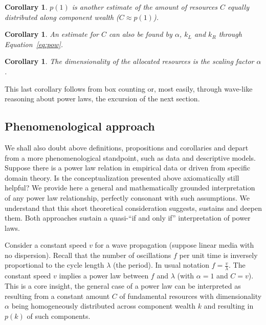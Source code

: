 \documentclass[a4paper, 11pt]{article} %
\newtheorem{corollary}[theorem2]{Corollary}
\begin{document}
\begin{corollary}
	$p(1)$ is another estimate of the amount of resources $C$ equally distributed along component wealth ($C\approx p(1)$).
\end{corollary}

\begin{corollary}
	An estimate for $C$ can also be found by $\alpha$, $k_L$ and $k_R$ through Equation~\ref{eq:pow}.
\end{corollary}

\begin{corollary}
	The dimensionality of the allocated resources is the scaling factor $\alpha$.
\end{corollary}

This last corollary follows from box counting or, most easily,
through wave-like reasoning about power laws,
the excursion of the next section.

\subsection{Phenomenological approach}\label{sec:phen}

We shall also
doubt above definitions, propositions and corollaries 
and depart from a more phenomenological standpoint,
such as data and descriptive models.
Suppose there is a power law relation in empirical data
or driven from specific domain theory.
Is the conceptualization
presented above axiomatically still helpful?
We provide here a general and mathematically grounded
interpretation of any power law relationship,
perfectly consonant with such assumptions.
We understand that this short theoretical consideration
suggests, sustains and deepen them.
Both approaches sustain a quasi-``if and only if''
interpretation of power laws.

Consider a constant speed $v$ for a wave propagation
(suppose linear media with no dispersion).
Recall that the number of oscillations $f$ per unit time is
inversely proportional to the cycle length $\lambda$ (the period).
In usual notation $f=\frac{v}{\lambda}$.
The constant speed $v$ implies a power law between 
$f$ and $\lambda$ (with $\alpha=1$ and $C=v$).
This is a core insight, the general case of a power law can
be interpreted as resulting from a constant amount $C$ of
fundamental resources with dimensionality $\alpha$ 
being homogeneously distributed across
component wealth $k$ and 
resulting in $p(k)$ of such components.
\end{document}

